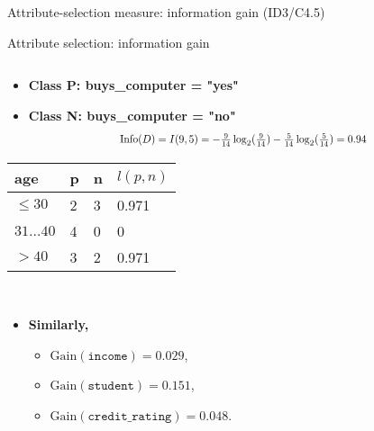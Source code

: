 \documentclass[aspectratio=169,t,table]{beamer}
\begin{document}
  {
    \begin{frame}{Attribute-selection measure: information gain (ID3/C4.5)}

    \end{frame}
  }

  {
    \begin{frame}{Attribute selection: information gain}
      \begin{columns}
        \begin{column}{0.45\textwidth}
          \begin{itemize}
            \item \textbf{Class P: buys\_computer = "yes"}
            \item \textbf{Class N: buys\_computer = "no"}
            \begin{align*}
              \resizebox{7cm}{!}{%
                $\text{Info}(D) = I(9,5) = - \frac{9}{14}\log_2(\frac{9}{14})-\frac{5}{14} \log_2(\frac{5}{14}) = 0.94$
              }
            \end{align*}
          \end{itemize}
          \centering
          \begin{tabular}{|l|l|l|l|}
            \hline
            \cellcolor{blue!20}age & \cellcolor{blue!20}p & \cellcolor{blue!20}n & \cellcolor{blue!20}$l(p,n)$ \\\hline
            \cellcolor{yellow!20}$\leq 30$ & 2 & 3 & 0.971 \\\hline
            \cellcolor{yellow!20}$31\ldots40$ & 4 & 0 & 0 \\\hline
            \cellcolor{yellow!20}$>40$ & 3 & 2 & 0.971 \\\hline
          \end{tabular}\\[0.2cm]
        \begin{itemize}
          \item \textbf{Similarly,}
          \begin{itemize}
            \item $\text{Gain}(\texttt{income}) = 0.029$,
            \item $\text{Gain}(\texttt{student}) = 0.151$,
            \item $\text{Gain}(\texttt{credit\_rating}) = 0.048$.
          \end{itemize}
        \end{itemize}
        \end{column}

\end{columns}
\end{frame}}
\end{document}
